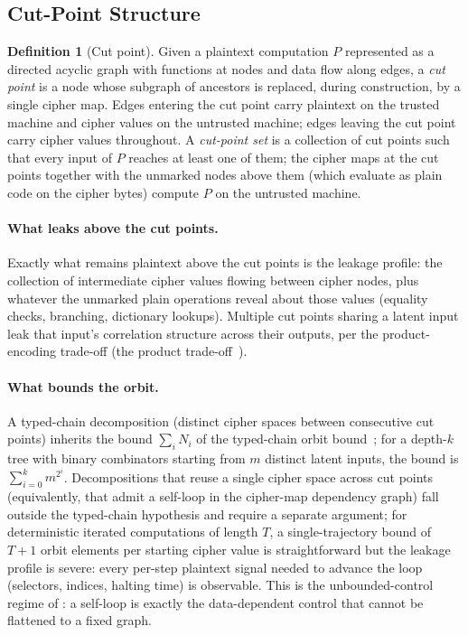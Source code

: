 \documentclass[11pt]{article}
\theoremstyle{definition}
\newtheorem{definition}{Definition}[section]
\theoremstyle{plain}
\theoremstyle{remark}
\begin{document}
\subsection{Cut-Point Structure}
\label{sec:tm-vs-tree}

\begin{definition}[Cut point]
\label{def:cut-point}
Given a plaintext computation $P$ represented as a directed acyclic
graph with functions at nodes and data flow along edges, a \emph{cut
point} is a node whose subgraph of ancestors is replaced, during
construction, by a single cipher map.
Edges entering the cut point carry plaintext on the trusted machine
and cipher values on the untrusted machine; edges leaving the cut
point carry cipher values throughout.
A \emph{cut-point set} is a collection of cut points such that every
input of $P$ reaches at least one of them; the cipher maps at the cut
points together with the unmarked nodes above them (which evaluate as
plain code on the cipher bytes) compute $P$ on the untrusted machine.
\end{definition}

\paragraph{What leaks above the cut points.}
Exactly what remains plaintext above the cut points is the leakage
profile: the collection of intermediate cipher values flowing between
cipher nodes, plus whatever the unmarked plain operations reveal about
those values (equality checks, branching, dictionary lookups).
Multiple cut points sharing a latent input leak that input's
correlation structure across their outputs, per the product-encoding
trade-off (the product trade-off~\cite{towell2026algebraic}).

\paragraph{What bounds the orbit.}
A typed-chain decomposition (distinct cipher spaces between
consecutive cut points) inherits the bound $\sum_i N_i$ of
the typed-chain orbit bound~\cite{towell2026algebraic}; for a depth-$k$ tree with binary combinators
starting from $m$ distinct latent inputs, the bound is
$\sum_{i=0}^{k} m^{2^i}$.
Decompositions that reuse a single cipher space across cut points
(equivalently, that admit a self-loop in the cipher-map dependency
graph) fall outside the typed-chain hypothesis and require a separate
argument; for deterministic iterated computations of length $T$, a
single-trajectory bound of $T+1$ orbit elements per starting cipher
value is straightforward but the leakage profile is severe:
every per-step plaintext signal needed to advance the loop (selectors,
indices, halting time) is observable.
This is the unbounded-control regime of : a
self-loop is exactly the data-dependent control that cannot be flattened
to a fixed graph.
\end{document}
